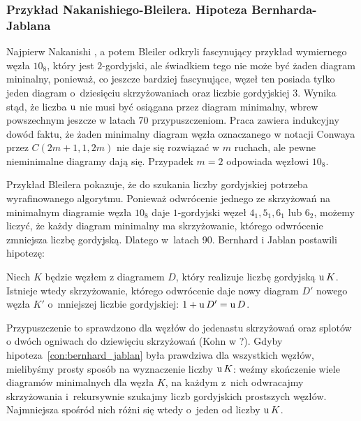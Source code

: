 
\subsubsection{Przykład Nakanishiego-Bleilera. Hipoteza Bernharda-Jablana}
Najpierw Nakanishi \cite{nakanishi1983}, a potem Bleiler \cite{bleiler1984} odkryli fascynujący przykład wymiernego węzła $10_8$, który jest $2$-gordyjski, ale świadkiem tego nie może być żaden diagram mininalny, ponieważ, co jeszcze bardziej fascynujące, węzeł ten posiada tylko jeden diagram o~dziesięciu skrzyżowaniach oraz liczbie gordyjskiej 3.
%
%
%
Wynika stąd, że liczba $\operatorname{u}$ nie musi być osiągana przez diagram minimalny, wbrew powszechnym jeszcze w latach 70 przypuszczeniom.
Praca \cite{bernhard1994} zawiera indukcyjny dowód faktu, że żaden minimalny diagram węzła oznaczanego w notacji Conwaya przez $C(2m+1, 1, 2m)$ nie daje się rozwiązać w $m$ ruchach, ale pewne nieminimalne diagramy dają się.
Przypadek $m = 2$ odpowiada węzłowi $10_8$.

Przykład Bleilera pokazuje, że do szukania liczby gordyjskiej potrzeba wyrafinowanego algorytmu.
Ponieważ odwrócenie jednego ze skrzyżowań na minimalnym diagramie węzła $10_8$ daje $1$-gordyjski węzeł $4_1, 5_1, 6_1$ lub $6_2$, możemy liczyć, że każdy diagram minimalny ma skrzyżowanie, którego odwrócenie zmniejsza liczbę gordyjską.
Dlatego w~latach 90. Bernhard \cite{bernhard1994} i Jablan \cite{jablan1998} postawili hipotezę:

\begin{conjecture}
%
%
%
\label{con:bernhard_jablan}%
    Niech $K$ będzie węzłem z diagramem $D$, który realizuje liczbę gordyjską $\operatorname{u} K$.
    Istnieje wtedy skrzyżowanie, którego odwrócenie daje nowy diagram $D'$ nowego węzła $K'$ o~mniejszej liczbie gordyjskiej: $1 + \operatorname{u} D' = \operatorname{u} D$.
\end{conjecture}

Przypuszczenie to sprawdzono dla węzłów do jedenastu skrzyżowań oraz splotów o dwóch ogniwach do dziewięciu skrzyżowań (Kohn w \cite{kohn1993}?).
%
Gdyby hipoteza~\ref{con:bernhard_jablan} była prawdziwa dla wszystkich węzłów, mielibyśmy prosty sposób na wyznaczenie liczby $\operatorname{u} K$: weźmy skończenie wiele diagramów minimalnych dla węzła $K$, na każdym z~nich odwracajmy skrzyżowania i~rekursywnie szukajmy liczb gordyjskich prostszych węzłów.
Najmniejsza spośród nich różni się wtedy o~jeden od liczby $\operatorname{u} K$.


